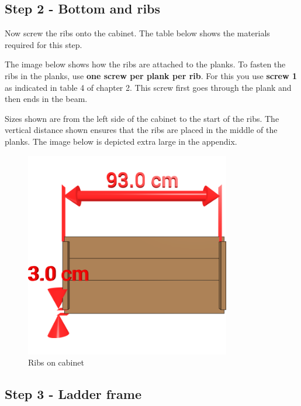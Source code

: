 \documentclass{article}
\begin{document}
\clearpage
\newpage

\subsection{Step 2 - Bottom and ribs}

Now screw the ribs onto the cabinet. The table below shows the materials required for this step.



The image below shows how the ribs are attached to the planks. To fasten the ribs in the planks, use \textbf{one screw per plank per rib}. For this you use \textbf{screw 1} as indicated in table 4 of chapter 2. This screw first goes through the plank and then ends in the beam.

Sizes shown are from the left side of the cabinet to the start of the ribs. The vertical distance shown ensures that the ribs are placed in the middle of the planks. The image below is depicted extra large in the appendix.

\begin{figure}[h!]
    \centering
    \includegraphics[width=0.8\textwidth]{scene 2 - bottom rib.png}
    \caption{Ribs on cabinet}
    \label{fig:stap 2}
\end{figure}

\clearpage
\newpage

\subsection{Step 3 - Ladder frame}
\end{document}
